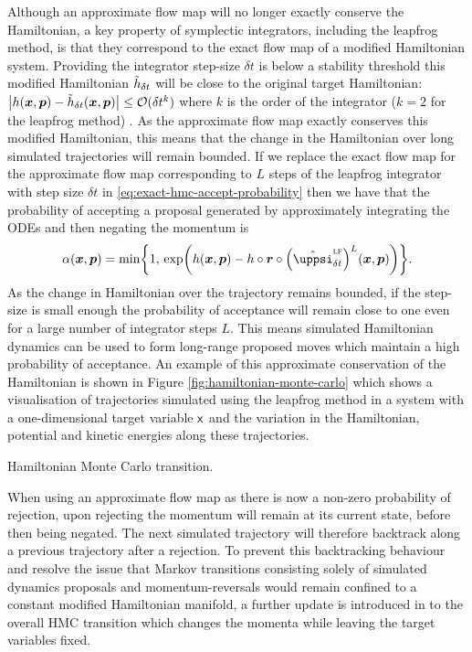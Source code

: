 Although an approximate flow map will no longer exactly conserve the Hamiltonian, a key property of symplectic integrators, including the leapfrog method, is that they correspond to the exact flow map of a modified Hamiltonian system. Providing the integrator step-size $\delta t$ is below a stability threshold this modified Hamiltonian $\tilde{h}_{\delta t}$ will be close to the original target Hamiltonian: 
\(
  \left|\hamiltonian(\vct{x},\vct{p}) - \tilde{\hamiltonian}_{\delta t}(\vct{x},\vct{p})\right|  
  \leq \mathcal{O}(\delta t^k)
\) 
where $k$ is the order of the integrator ($k=2$ for the leapfrog method) \citep{leimkuhler2004simulating}. As the approximate flow map exactly conserves this modified Hamiltonian, this means that the change in the Hamiltonian over long simulated trajectories will remain bounded. If we replace the exact flow map for the approximate flow map corresponding to $L$ steps of the leapfrog integrator with step size $\delta t$ in \eqref{eq:exact-hmc-accept-probability} then we have that the probability of accepting a proposal generated by approximately integrating the \acp{ODE} and then negating the momentum is
\begin{equation}\label{eq:hmc-accept-probability}
  \alpha(\vct{x},\vct{p}) =
  \min\lbr 
    1,\,
    \exp\lpa
      \hamiltonian(\vct{x},\vct{p}) -\hamiltonian \circ \vct{r} \circ \lpa \hat{\flowmap}^{\textsc{lf}}_{\delta t}\rpa^L(\vct{x}, \vct{p})
    \rpa
  \rbr.
\end{equation}
As the change in Hamiltonian over the trajectory remains bounded, if the step-size is small enough the probability of acceptance will remain close to one even for a large number of integrator steps $L$. This means simulated Hamiltonian dynamics can be used to form long-range proposed moves which maintain a high probability of acceptance. An example of this approximate conservation of the Hamiltonian is shown in Figure \ref{fig:hamiltonian-monte-carlo} which shows a visualisation of trajectories simulated using the leapfrog method in a system with a one-dimensional target variable $\mathsf{x}$ and the variation in the Hamiltonian, potential and kinetic energies along these trajectories.

\begin{algorithm}[!t]
\caption{Hamiltonian Monte Carlo transition.}
\label{alg:hamiltonian-monte-carlo}

\end{algorithm}

When using an approximate flow map as there is now a non-zero probability of rejection, upon rejecting the momentum will remain at its current state, before then being negated. The next simulated trajectory will therefore backtrack along a previous trajectory after a rejection. To prevent this backtracking behaviour and resolve the issue that Markov transitions consisting solely of simulated dynamics proposals and momentum-reversals would remain confined to a constant modified Hamiltonian manifold, a further update is introduced in to the overall \ac{HMC} transition which changes the momenta while leaving the target variables fixed. 

